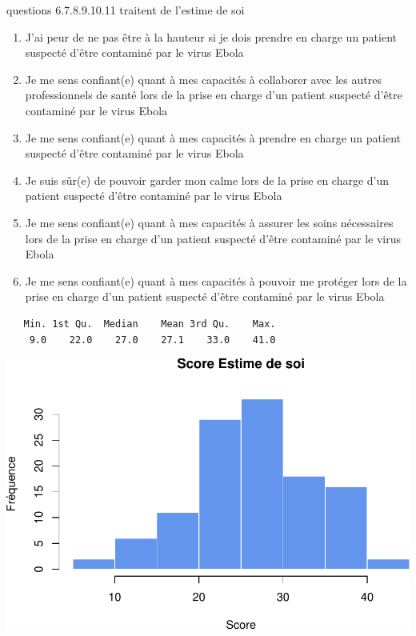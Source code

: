 \documentclass[]{article}
\begin{document}
questions 6.7.8.9.10.11 traitent de l'estime de soi

\begin{enumerate}
\def\labelenumi{\arabic{enumi}.}
\setcounter{enumi}{5}
\itemsep1pt\parskip0pt
\item
  J'ai peur de ne pas être à la hauteur si je dois prendre en charge un
  patient suspecté d'être contaminé par le virus Ebola
\item
  Je me sens confiant(e) quant à mes capacités à collaborer avec les
  autres professionnels de santé lors de la prise en charge d'un patient
  suspecté d'être contaminé par le virus Ebola
\item
  Je me sens confiant(e) quant à mes capacités à prendre en charge un
  patient suspecté d'être contaminé par le virus Ebola
\item
  Je suis sûr(e) de pouvoir garder mon calme lors de la prise en charge
  d'un patient suspecté d'être contaminé par le virus Ebola
\item
  Je me sens confiant(e) quant à mes capacités à assurer les soins
  nécessaires lors de la prise en charge d'un patient suspecté d'être
  contaminé par le virus Ebola
\item
  Je me sens confiant(e) quant à mes capacités à pouvoir me protéger
  lors de la prise en charge d'un patient suspecté d'être contaminé par
  le virus Ebola
\end{enumerate}

\begin{verbatim}
   Min. 1st Qu.  Median    Mean 3rd Qu.    Max. 
    9.0    22.0    27.0    27.1    33.0    41.0 
\end{verbatim}

\includegraphics{analyse_files/figure-latex/unnamed-chunk-24-1.pdf}
\end{document}
